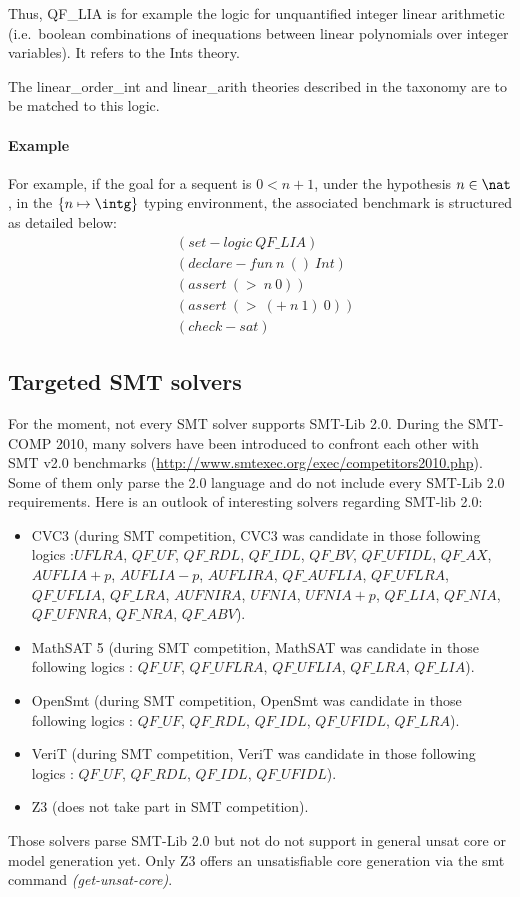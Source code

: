 Thus, QF\_LIA is for example the logic for unquantified integer linear arithmetic (i.e.\ boolean combinations of inequations between linear polynomials over integer variables). It refers to the Ints theory.

The linear\_order\_int and linear\_arith theories described in the taxonomy\cite{TAXO09} are to be matched to this logic. 

\paragraph{Example}
For example, if the goal for a sequent is $0 < n + 1$, under the hypothesis $n \in \nat$, in the $\{n \mapsto \intg\}$ typing environment, the associated benchmark is structured as detailed below:
\begin{align*}           
&(set-logic~QF\_LIA)                     \\
&(declare-fun~n~()~Int)                 \\
&(assert~(>~n~0))						\\
&(assert~(>~(+~n~1)~0))					\\
&(check-sat)
\end{align*}


\subsection{Targeted SMT solvers}
For the moment, not every SMT solver supports SMT-Lib 2.0. During the SMT-COMP 2010, many solvers have been introduced to confront each other with SMT v2.0 benchmarks (\url{http://www.smtexec.org/exec/competitors2010.php}). Some of them only parse the 2.0 language and do not include every SMT-Lib 2.0 requirements. Here is an outlook of interesting solvers regarding SMT-lib 2.0:

\begin{itemize}
\item CVC3 \cite{CVC3}(during SMT competition, CVC3 was candidate in those following logics :$UFLRA$, $QF\_UF$, $QF\_RDL$, $QF\_IDL$, $QF\_BV$, $QF\_UFIDL$, $QF\_AX$, $AUFLIA+p$, $AUFLIA-p$, $AUFLIRA$, $QF\_AUFLIA$, $QF\_UFLRA$, $QF\_UFLIA$, $QF\_LRA$, $AUFNIRA$, $UFNIA$, $UFNIA+p$, $QF\_LIA$, $QF\_NIA$, $QF\_UFNRA$, $QF\_NRA$, $QF\_ABV$). 

\item MathSAT 5 \cite{MATHSAT} (during SMT competition, MathSAT was candidate in those following logics : $QF\_UF$, $QF\_UFLRA$, $QF\_UFLIA$, $QF\_LRA$, $QF\_LIA$).

\item OpenSmt \cite{OPENSMT}(during SMT competition, OpenSmt was candidate in those following logics : $QF\_UF$, $QF\_RDL$, $QF\_IDL$, $QF\_UFIDL$, $QF\_LRA$).

\item VeriT\cite{VERIT} (during SMT competition, VeriT was candidate in those following logics : $QF\_UF$, $QF\_RDL$, $QF\_IDL$, $QF\_UFIDL$).

\item Z3 \cite{Z3} (does not take part in SMT competition). 

\end{itemize}

Those solvers parse SMT-Lib 2.0 but not do not support in general unsat core or model generation yet. Only Z3 offers an unsatisfiable core generation via the smt command \textit{(get-unsat-core)}.